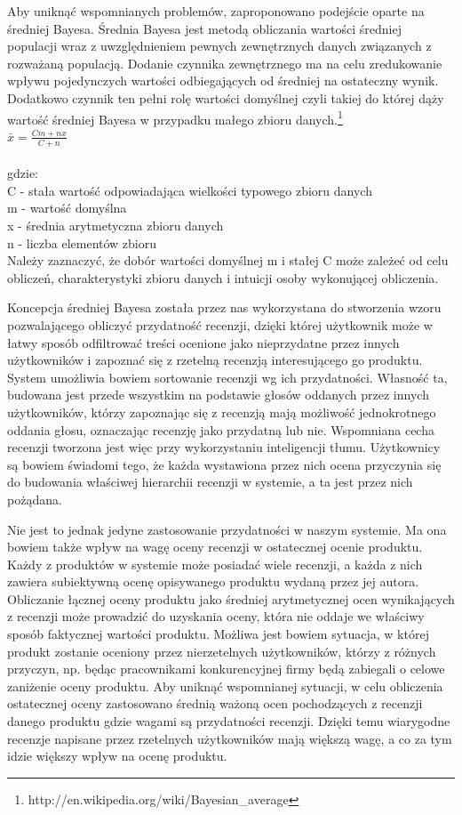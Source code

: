 Aby uniknąć wspomnianych problemów, zaproponowano podejście oparte na średniej Bayesa. Średnia Bayesa jest metodą obliczania wartości średniej populacji wraz z uwzględnieniem pewnych zewnętrznych danych związanych z rozważaną populacją. Dodanie czynnika zewnętrznego ma na celu zredukowanie wpływu pojedynczych wartości odbiegających od średniej na ostateczny wynik. Dodatkowo czynnik ten pełni rolę wartości domyślnej czyli takiej do której dąży wartość średniej Bayesa w przypadku małego zbioru danych.\footnote{http://en.wikipedia.org/wiki/Bayesian\_average}\\

$\bar{x}=\frac{Cm+nx}{C+n}$\\\\
gdzie:\\
C - stała wartość odpowiadająca wielkości typowego zbioru danych\\
m - wartość domyślna\\
x - średnia arytmetyczna zbioru danych\\
n - liczba elementów zbioru\\


Należy zaznaczyć, że dobór wartości domyślnej m i stałej C może zależeć od celu obliczeń, charakterystyki zbioru danych i intuicji osoby wykonującej obliczenia.

Koncepcja średniej Bayesa została przez nas wykorzystana do stworzenia wzoru pozwalającego obliczyć przydatność recenzji, dzięki której użytkownik może w łatwy sposób odfiltrować treści ocenione jako nieprzydatne przez innych użytkowników i zapoznać się z rzetelną recenzją interesującego go produktu. System umożliwia bowiem sortowanie recenzji wg ich przydatności. Własność ta, budowana jest przede wszystkim na podstawie głosów oddanych przez innych użytkowników, którzy zapoznając się z recenzją mają możliwość jednokrotnego oddania głosu, oznaczając recenzję jako przydatną lub nie. Wspomniana cecha recenzji tworzona jest więc przy wykorzystaniu inteligencji tłumu. Użytkownicy są bowiem świadomi tego, że każda wystawiona przez nich ocena przyczynia się do budowania właściwej hierarchii recenzji w systemie, a ta jest przez nich pożądana.

Nie jest to jednak jedyne zastosowanie przydatności w naszym systemie. Ma ona bowiem także wpływ na wagę oceny recenzji w ostatecznej ocenie produktu. Każdy z produktów w systemie może posiadać wiele recenzji, a każda z nich zawiera subiektywną ocenę opisywanego produktu wydaną przez jej autora. Obliczanie łącznej oceny produktu jako średniej arytmetycznej ocen wynikających z recenzji może prowadzić do uzyskania oceny, która nie oddaje we właściwy sposób faktycznej wartości produktu. Możliwa jest bowiem sytuacja, w której produkt zostanie oceniony przez nierzetelnych użytkowników, którzy z różnych przyczyn, np. będąc pracownikami konkurencyjnej firmy będą zabiegali o celowe zaniżenie oceny produktu. Aby uniknąć wspomnianej sytuacji, w celu obliczenia ostatecznej oceny zastosowano średnią ważoną ocen pochodzących z recenzji danego produktu gdzie wagami są przydatności recenzji. Dzięki temu wiarygodne  recenzje napisane przez rzetelnych użytkowników mają większą wagę, a co za tym idzie większy wpływ na ocenę produktu.

